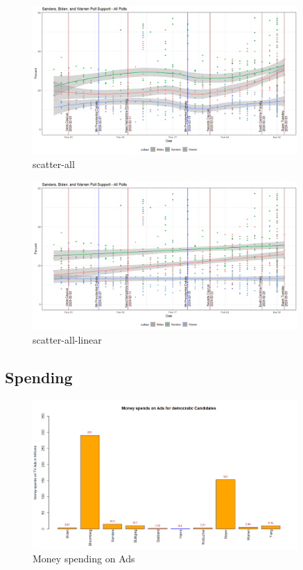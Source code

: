 \begin{figure}[H]
    \centering
    \includegraphics[width=0.9\textwidth]{figures/scatter-all.png}
    \caption{scatter-all}
    \label{scatter-all}
\end{figure}

\begin{figure}[H]
    \centering
    \includegraphics[width=0.9\textwidth]{figures/scatter-all-linear.png}
    \caption{scatter-all-linear}
    \label{scatter-all-linear}
\end{figure}

\subsection{Spending}

\begin{figure}[H]
    \centering
    \includegraphics[width=0.9\textwidth]{figures/MoneyspendinAds.png}
    \caption{Money spending on Ads}
    \label{MoneyspendinAds}
\end{figure}


